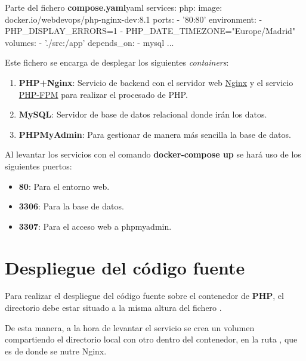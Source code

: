 \documentclass{\ClassPath/viu-tfm-template}
\begin{document}
\begin{mycode}{Parte del fichero \textbf{compose.yaml}}{yaml}{}
services:
    php:
        image: docker.io/webdevops/php-nginx-dev:8.1
        ports:
            - '80:80'
        environment:
            - PHP_DISPLAY_ERRORS=1
            - PHP_DATE_TIMEZONE="Europe/Madrid"
        volumes:
            - './src:/app'
        depends_on:
            - mysql
...
\end{mycode}

Este fichero se encarga de desplegar los siguientes \textit{containers}:
\vspace{-1em}
\begin{enumerate}
    \item \textbf{PHP+Nginx}: Servicio de backend con el servidor web
    \href{https://nginx.org/}{Nginx} y el servicio \href{https://php-fpm.org/}{PHP-FPM} para realizar el procesado de PHP.
    \item \textbf{MySQL}: Servidor de base de datos relacional donde irán los datos.
    \item \textbf{PHPMyAdmin}: Para gestionar de manera más sencilla la base de datos.
\end{enumerate}
\vspace{-1em}

Al levantar los servicios con el comando \textbf{docker-compose up} se hará uso de los siguientes puertos:
\vspace{-1em}
\begin{itemize}
    \item \textbf{80}: Para el entorno web.
    \item \textbf{3306}: Para la base de datos.
    \item \textbf{3307}: Para el acceso web a phpmyadmin.
\end{itemize}
\vspace{-1em}

\section{Despliegue del código fuente}
Para realizar el despliegue del código fuente sobre el contenedor de \textbf{PHP}, el directorio  debe estar situado a la misma altura del fichero .

De esta manera, a la hora de levantar el servicio se crea un volumen compartiendo el directorio local  con otro dentro del contenedor, en la ruta , que es de donde se nutre Nginx.
\end{document}
